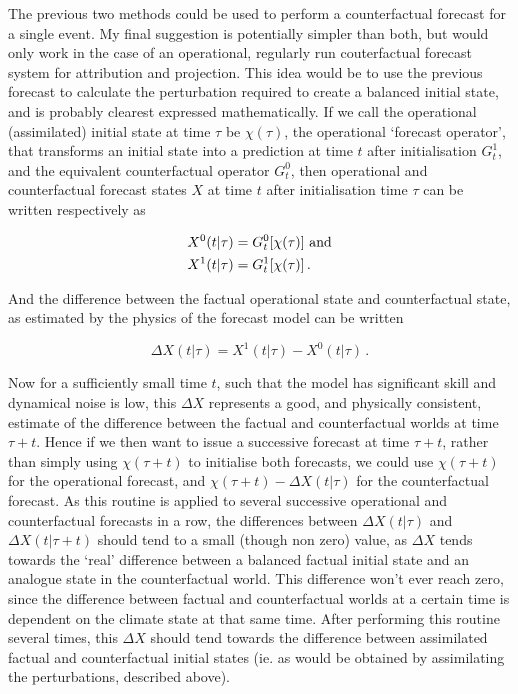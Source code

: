       The previous two methods could be used to perform a counterfactual forecast for a single event. My final suggestion is potentially simpler than both, but would only work in the case of an operational, regularly run couterfactual forecast system for attribution and projection. This idea would be to use the previous forecast to calculate the perturbation required to create a balanced initial state, and is probably clearest expressed mathematically. If we call the operational (assimilated) initial state at time $\tau$ be $\chi(\tau)$, the operational `forecast operator', that transforms an initial state into a prediction at time $t$ after initialisation $G_t^1$, and the equivalent counterfactual operator $G_t^0$, then operational and counterfactual forecast states $X$ at time $t$ after initialisation time $\tau$ can be written respectively as

      \begin{align*}
        X^0(t|\tau) &= G_t^0[\chi(\tau)] \ \textnormal{and}\\
        X^1(t|\tau) &= G_t^1[\chi(\tau)]\,.
      \end{align*}

      \noindent And the difference between the factual operational state and counterfactual state, as estimated by the physics of the forecast model can be written

      \begin{equation}
        \Delta X(t|\tau) = X^1(t|\tau) - X^0(t|\tau)\,.
      \end{equation}

      \noindent Now for a sufficiently small time $t$, such that the model has significant skill and dynamical noise is low, this $\Delta X$ represents a good, and physically consistent, estimate of the difference between the factual and counterfactual worlds at time $\tau + t$. Hence if we then want to issue a successive forecast at time $\tau + t$, rather than simply using $\chi(\tau+t)$ to initialise both forecasts, we could use $\chi(\tau+t)$ for the operational forecast, and $\chi(\tau+t) - \Delta X(t|\tau)$ for the counterfactual forecast. As this routine is applied to several successive operational and counterfactual forecasts in a row, the differences between $\Delta X(t|\tau)$ and $\Delta X(t|\tau+t)$ should tend to a small (though non zero) value, as $\Delta X$ tends towards the `real' difference between a balanced factual initial state and an analogue state in the counterfactual world. This difference won't ever reach zero, since the difference between factual and counterfactual worlds at a certain time is dependent on the climate state at that same time. After performing this routine several times, this $\Delta X$ should tend towards the difference between assimilated factual and counterfactual initial states (ie. as would be obtained by assimilating the perturbations, described above).

